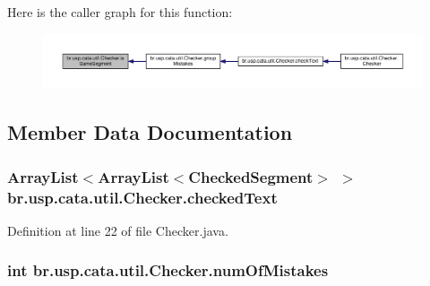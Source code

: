 Here is the caller graph for this function\+:\nopagebreak
\begin{figure}[H]
\begin{center}
\leavevmode
\includegraphics[width=350pt]{classbr_1_1usp_1_1cata_1_1util_1_1_checker_afaa39c2ba7ada7c1aac1ec584feceb5b_icgraph}
\end{center}
\end{figure}




\subsection{Member Data Documentation}
\hypertarget{classbr_1_1usp_1_1cata_1_1util_1_1_checker_a5ca7c08e1b70c58cfa85e6c1298e0c4c}{
\subsubsection[{checked\+Text}]{\setlength{\rightskip}{0pt plus 5cm}Array\+List$<$Array\+List$<${\bf Checked\+Segment}$>$ $>$ br.\+usp.\+cata.\+util.\+Checker.\+checked\+Text\hspace{0.3cm}{\ttfamily [private]}}}\label{classbr_1_1usp_1_1cata_1_1util_1_1_checker_a5ca7c08e1b70c58cfa85e6c1298e0c4c}


Definition at line 22 of file Checker.\+java.

\hypertarget{classbr_1_1usp_1_1cata_1_1util_1_1_checker_a45df041356a12efeed357f876d5b25ae}{
\subsubsection[{num\+Of\+Mistakes}]{\setlength{\rightskip}{0pt plus 5cm}int br.\+usp.\+cata.\+util.\+Checker.\+num\+Of\+Mistakes\hspace{0.3cm}{\ttfamily [private]}}}\label{classbr_1_1usp_1_1cata_1_1util_1_1_checker_a45df041356a12efeed357f876d5b25ae}


